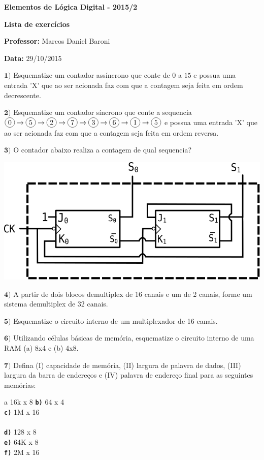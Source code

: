 \documentclass[12pt]{article}
\newcommand{\exerc}[3]{ \vspace*{25pt} {$\mathbf{#1)}$} #2 \hfill {\it #3} }
\newcommand{\exitem}[2]{ \texttt{\bf #1)} #2 \\ }
\newenvironment{exitems}[1]{
\\
\hspace*{30pt}
\begin{minipage}{0.8\textwidth}
\begin{multicols}{#1} 
}{
\end{multicols}
\end{minipage}
}
\newcommand*\circled[1]{\tikz[baseline=(char.base)]{
            \node[shape=circle,draw,inner sep=2pt] (char) {#1};}}
\begin{document}

\begin{center}
{\Large \bf Elementos de Lógica Digital - 2015/2}
\end{center}

{\large \bf Lista de exercícios}

{\bf Professor:} Marcos Daniel Baroni

{\bf Data:} 29/10/2015


\exerc{1}{Esquematize um contador assíncrono que conte de $0$ a $15$ e possua uma entrada 'X'
	que ao ser acionada faz com que a contagem seja feita em ordem decrescente.}{}

\exerc{2}{Esquematize um contador síncrono que conte a sequencia
	$\circled{0} \rightarrow
	\circled{5} \rightarrow
	\circled{2} \rightarrow
	\circled{7} \rightarrow
	\circled{3} \rightarrow
	\circled{6} \rightarrow
	\circled{1} \rightarrow \circled{5}$ e possua uma entrada 'X' que ao ser acionada faz com que a contagem
 	seja feita em ordem reversa.}{}

\exerc{3}{O contador abaixo realiza a contagem de qual sequencia?}{}
\begin{center}
		\includegraphics[scale=0.6]{cont1} \\ \vspace{15pt}
\end{center}

\exerc{4}{ A partir de dois blocos demultiplex de 16 canais e um de 2 canais, forme um sistema demultiplex de 32 canais.}{}

\exerc{5}{ Esquematize o circuito interno de um multiplexador de 16 canais.}{}

\exerc{6}{ Utilizando células básicas de memória, esquematize o circuito interno de uma RAM (a) 8x4 e (b) 4x8. }{}


\exerc{7}{Defina
(I) capacidade de memória,
(II) largura de palavra de dados,
(III) largura da barra de endereços e
(IV) palavra de endereço final
para as seguintes memórias:}{}
\begin{exitems}{2}
	\exitem{a}{ 16k x 8 }
	\exitem{b}{ 64 x 4 }
	\exitem{c}{ 1M x 16 }
	\\
	\exitem{d}{ 128 x 8 }
	\exitem{e}{ 64K x 8 }
	\exitem{f}{ 2M x 16 }
\end{exitems}
\end{document}
